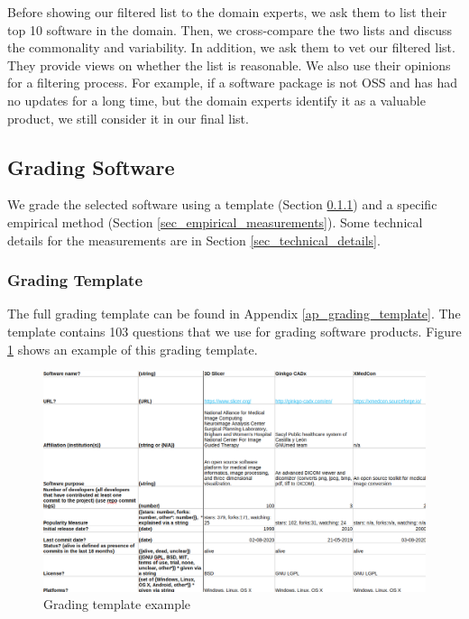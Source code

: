 \documentclass[preprint,12pt,authoryear]{elsarticle}
\begin{document}
Before showing our filtered list to the domain experts, we ask them to list
their top 10 software in the domain. Then, we cross-compare the two lists and
discuss the commonality and variability.  In addition, we ask them to vet our
filtered list. They provide views on whether the list is reasonable. We also use
their opinions for a filtering process. For example, if a software package is
not OSS and has had no updates for a long time, but the domain experts identify
it as a valuable product, we still consider it in our final list.

\subsection{Grading Software} \label{sec_grading_software}

We grade the selected software using a template (Section
\ref{sec_grading_template}) and a specific empirical method (Section
\ref{sec_empirical_measurements}). Some technical details for the measurements
are in Section \ref{sec_technical_details}.

\subsubsection{Grading Template} \label{sec_grading_template}

The full grading template can be found in Appendix \ref{ap_grading_template}.
The template contains 103 questions that we use for grading software products.
Figure \ref{fg_grading_template_example} shows an example of this grading
template.

\begin{figure}[ht]
\includegraphics[scale=0.42]{figures/template.png}
\caption{Grading template example}
\label{fg_grading_template_example}
\end{figure}
\end{document}
